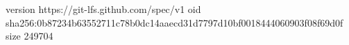 version https://git-lfs.github.com/spec/v1
oid sha256:0b87234b63552711c78b0dc14aaecd31d7797d10bf0018444060903f08f69d0f
size 249704
